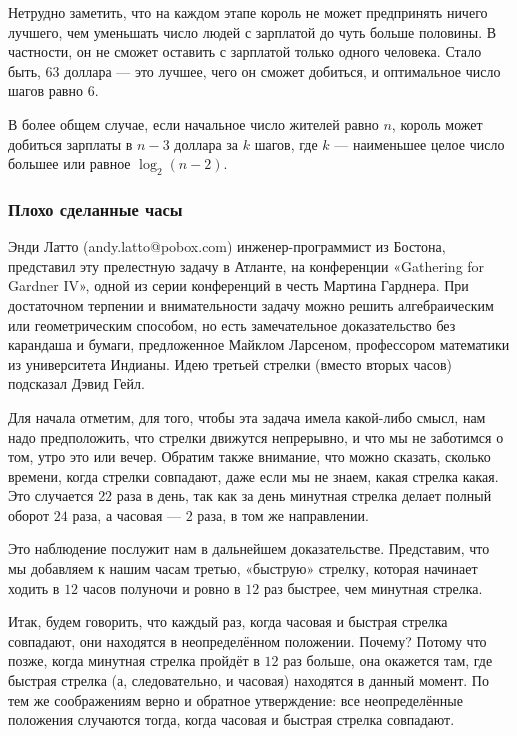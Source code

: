 Нетрудно заметить, что на каждом этапе король не может предпринять ничего лучшего, чем уменьшать число людей с зарплатой до чуть больше половины.
В частности, он не сможет оставить с зарплатой только одного человека.
Стало быть, $63$ доллара --- это лучшее, чего он сможет добиться, и оптимальное число шагов равно $6$.
\heart

В более общем случае, если начальное число жителей равно $n$, король может добиться зарплаты в $n-3$ доллара за $k$ шагов, где $k$ --- наименьшее целое число большее или равное $\log_2(n-2)$.

\subsubsection*{Плохо сделанные часы}%

Энди Латто %
(andy.latto@pobox.com) инженер-программист из Бостона, представил эту прелестную задачу в Атланте, на конференции «Gathering for Gard\-ner IV», одной из серии конференций в честь Мартина Гарднера.
При достаточном терпении и внимательности задачу можно решить алгебраическим или геометрическим способом, но есть замечательное доказательство без карандаша и бумаги, предложенное Майклом Ларсеном, %
профессором математики из университета Индианы.
Идею третьей стрелки (вместо вторых часов) подсказал Дэвид Гейл. %

\medskip

Для начала отметим, для того, чтобы эта задача имела какой-либо смысл, нам надо предположить, что стрелки движутся непрерывно, и что мы не заботимся о том, утро это или вечер.
Обратим также внимание, что можно сказать, сколько времени, когда стрелки совпадают, даже если мы не знаем, какая стрелка какая.
Это случается $22$ раза в день, так как за день минутная стрелка делает полный оборот $24$ раза, а часовая --- $2$ раза, в том же направлении.

Это наблюдение послужит нам в дальнейшем доказательстве.
Представим, что мы добавляем к нашим часам третью, «быструю» стрелку, которая начинает ходить в $12$ часов полуночи и ровно в $12$ раз быстрее, чем минутная стрелка.

Итак, будем говорить, что каждый раз, когда часовая и быстрая стрелка совпадают, они находятся в неопределённом положении.
Почему?
Потому что позже, когда минутная стрелка пройдёт в $12$ раз больше, она окажется там, где быстрая стрелка (а, следовательно, и часовая) находятся в данный момент.
По тем же соображениям верно и обратное утверждение: все неопределённые положения случаются тогда, когда часовая и быстрая стрелка совпадают.

